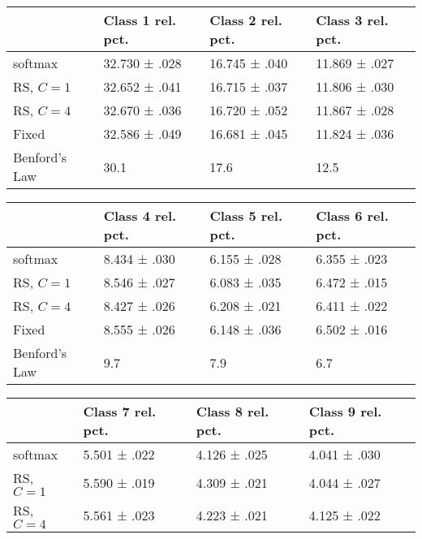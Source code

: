 \begin{table}[ht]
	\renewcommand{\arraystretch}{1.4}
	\centering
	\begin{tabular}{l|l|l|l|}
		\cline{2-4}
		& Class 1 rel. pct. & Class 2 rel. pct. & Class 3 rel. pct. \\ \hline
		\multicolumn{1}{|l|}{softmax}       & 32.730 ± .028     & 16.745 ± .040     & 11.869 ± .027     \\ \hline
		\multicolumn{1}{|l|}{RS, $C=1$}     & 32.652 ± .041     & 16.715 ± .037     & 11.806 ± .030     \\ \hline
		\multicolumn{1}{|l|}{RS, $C=4$}     & 32.670 ± .036     & 16.720 ± .052     & 11.867 ± .028     \\ \hline
		\multicolumn{1}{|l|}{Fixed}         & 32.586 ± .049     & 16.681 ± .045     & 11.824 ± .036     \\ \hline
		\multicolumn{1}{|l|}{Benford's Law} & 30.1              & 17.6              & 12.5              \\ \hline
	\end{tabular}
	\begin{tabular}{l|l|l|l|}
		\cline{2-4}
		& Class 4 rel. pct. & Class 5 rel. pct. & Class 6 rel. pct. \\ \hline
		\multicolumn{1}{|l|}{softmax}       & 8.434 ± .030      & 6.155 ± .028      & 6.355 ± .023      \\ \hline
		\multicolumn{1}{|l|}{RS, $C=1$}     & 8.546 ± .027      & 6.083 ± .035      & 6.472 ± .015      \\ \hline
		\multicolumn{1}{|l|}{RS, $C=4$}     & 8.427 ± .026      & 6.208 ± .021      & 6.411 ± .022      \\ \hline
		\multicolumn{1}{|l|}{Fixed}         & 8.555 ± .026      & 6.148 ± .036      & 6.502 ± .016      \\ \hline
		\multicolumn{1}{|l|}{Benford's Law} & 9.7               & 7.9               & 6.7               \\ \hline
	\end{tabular}
\begin{tabular}{l|l|l|l|}
	\cline{2-4}
	& Class 7 rel. pct. & Class 8 rel. pct. & Class 9 rel. pct. \\ \hline
	\multicolumn{1}{|l|}{softmax}       & 5.501 ± .022      & 4.126 ± .025      & 4.041 ± .030      \\ \hline
	\multicolumn{1}{|l|}{RS, $C=1$}     & 5.590 ± .019      & 4.309 ± .021      & 4.044 ± .027      \\ \hline
	\multicolumn{1}{|l|}{RS, $C=4$}     & 5.561 ± .023      & 4.223 ± .021      & 4.125 ± .022      \\ \hline

\end{tabular}
\end{table}
